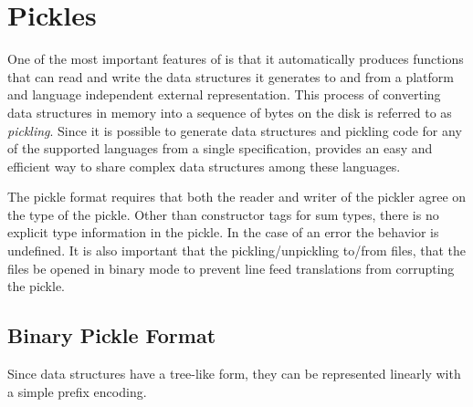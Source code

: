 %
\chapter{Pickles}
\label{sec:pickles}

One of the most important features of \asdlgen{} is that it automatically
produces functions that can read and write the data structures it generates
to and from a platform and language independent external
representation.
This process of converting data structures in memory into a
sequence of bytes on the disk is referred to as \emph{pickling}.
Since it is possible to generate data structures and pickling code for
any of the supported languages from a single \asdl{} specification,
\asdlgen{} provides an easy
and efficient way to share complex data structures among these languages.

The \asdl{} pickle format requires that both the reader and writer
of the pickler agree on the type of the pickle.
Other than constructor tags for sum types, there is no explicit type
information in the pickle.
In the case of an error the behavior is undefined.
It is also important that the pickling/unpickling to/from files, that the
files be opened in binary mode to prevent line feed translations from corrupting
the pickle.

\section{Binary Pickle Format}

Since \asdl{} data structures have a tree-like form, they can be represented
linearly with a simple prefix encoding.

